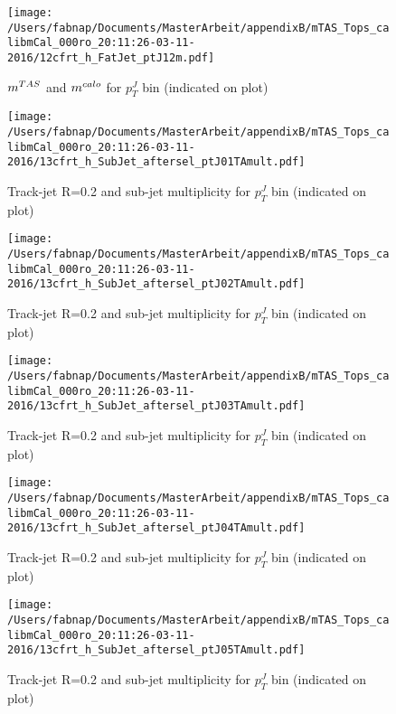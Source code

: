 \begin{figure}
 
\texttt{[image: /Users/fabnap/Documents/MasterArbeit/appendixB/mTAS\_Tops\_calibmCal\_000ro\_20:11:26-03-11-2016/12cfrt\_h\_FatJet\_ptJ12m.pdf]}
\caption{$m^{TAS}$ and $m^{calo}$ for $p_{T}^{J}$ bin (indicated on plot) }
 
\end{figure}
\clearpage %
\begin{figure}
 
\texttt{[image: /Users/fabnap/Documents/MasterArbeit/appendixB/mTAS\_Tops\_calibmCal\_000ro\_20:11:26-03-11-2016/13cfrt\_h\_SubJet\_aftersel\_ptJ01TAmult.pdf]}
\caption{Track-jet R=0.2 and sub-jet multiplicity for $p_{T}^{J}$ bin (indicated on plot) }
 
\end{figure}
 
\begin{figure}
 
\texttt{[image: /Users/fabnap/Documents/MasterArbeit/appendixB/mTAS\_Tops\_calibmCal\_000ro\_20:11:26-03-11-2016/13cfrt\_h\_SubJet\_aftersel\_ptJ02TAmult.pdf]}
\caption{Track-jet R=0.2 and sub-jet multiplicity for $p_{T}^{J}$ bin (indicated on plot) }
 
\end{figure}
 
\begin{figure}
 
\texttt{[image: /Users/fabnap/Documents/MasterArbeit/appendixB/mTAS\_Tops\_calibmCal\_000ro\_20:11:26-03-11-2016/13cfrt\_h\_SubJet\_aftersel\_ptJ03TAmult.pdf]}
\caption{Track-jet R=0.2 and sub-jet multiplicity for $p_{T}^{J}$ bin (indicated on plot) }
 
\end{figure}
 
\begin{figure}
 
\texttt{[image: /Users/fabnap/Documents/MasterArbeit/appendixB/mTAS\_Tops\_calibmCal\_000ro\_20:11:26-03-11-2016/13cfrt\_h\_SubJet\_aftersel\_ptJ04TAmult.pdf]}
\caption{Track-jet R=0.2 and sub-jet multiplicity for $p_{T}^{J}$ bin (indicated on plot) }
 
\end{figure}
 
\begin{figure}
 
\texttt{[image: /Users/fabnap/Documents/MasterArbeit/appendixB/mTAS\_Tops\_calibmCal\_000ro\_20:11:26-03-11-2016/13cfrt\_h\_SubJet\_aftersel\_ptJ05TAmult.pdf]}
\caption{Track-jet R=0.2 and sub-jet multiplicity for $p_{T}^{J}$ bin (indicated on plot) }
 
\end{figure}
 
